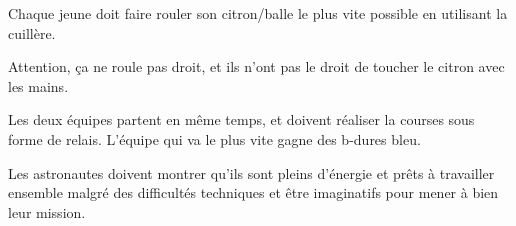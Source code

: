 \documentclass{grand-jeu}
\begin{document}
\begin{liste-materiel}
\end{liste-materiel}

\begin{regles}
Chaque jeune doit faire rouler son citron/balle le plus vite possible en utilisant la cuillère. 

Attention, ça ne roule pas droit, et ils n'ont pas le droit de toucher le citron avec les mains.

Les deux équipes partent en même temps, et doivent réaliser la courses sous forme de relais. L’équipe qui va le plus vite gagne des b-dures bleu. 
\end{regles}

\begin{imaginaire}
Les astronautes doivent montrer qu'ils sont pleins d'énergie et prêts à travailler ensemble malgré des difficultés techniques et être imaginatifs  pour mener à bien leur mission.  
\end{imaginaire}

\begin{moments-stop}
\end{moments-stop}
\end{document}
